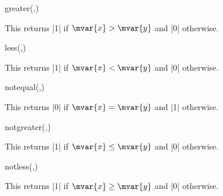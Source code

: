 \begin{math-function}{greater(,)}
\mathcommand

	This returns |1| if $\mvar{x}>\mvar{y}$ and |0| otherwise.
	
\begin{codeexample}[]
 \pgfmathresult
\end{codeexample}

\end{math-function}

\begin{math-function}{less(,)}
\mathcommand

	This returns |1| if $\mvar{x}<\mvar{y}$ and |0| otherwise.
	
\begin{codeexample}[]
 \pgfmathresult
\end{codeexample}
\end{math-function}

\begin{math-function}{notequal(,)}
\mathcommand

	This returns |0| if $\mvar{x}=\mvar{y}$ and |1| otherwise.
	
\begin{codeexample}[]
 \pgfmathresult
\end{codeexample}

\end{math-function}

\begin{math-function}{notgreater(,)}
\mathcommand

	This returns |1| if $\mvar{x}\leq\mvar{y}$ and |0| otherwise.
	
\begin{codeexample}[]
 \pgfmathresult
\end{codeexample}
\end{math-function}

\begin{math-function}{notless(,)}
\mathcommand

	This returns |1| if $\mvar{x}\geq\mvar{y}$ and |0| otherwise.
	
\begin{codeexample}[]
 \pgfmathresult
\end{codeexample}

\end{math-function}

